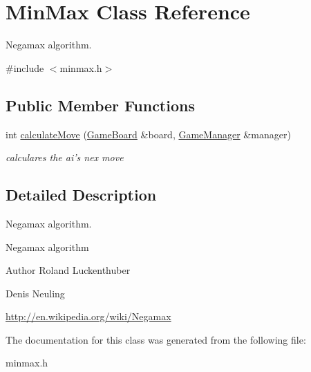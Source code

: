\hypertarget{classMinMax}{\section{\-Min\-Max \-Class \-Reference}
\label{classMinMax}
}


\-Negamax algorithm.  




{\ttfamily \#include $<$minmax.\-h$>$}

\subsection*{\-Public \-Member \-Functions}
\begin{DoxyCompactItemize}
\item 
\hypertarget{classMinMax_a0727d40296556cb72e6b147796e9cb06}{int \hyperlink{classMinMax_a0727d40296556cb72e6b147796e9cb06}{calculate\-Move} (\hyperlink{classGameBoard}{\-Game\-Board} \&board, \hyperlink{classGameManager}{\-Game\-Manager} \&manager)}\label{classMinMax_a0727d40296556cb72e6b147796e9cb06}

\begin{DoxyCompactList}\small\item\em calculares the ai's nex move \end{DoxyCompactList}\end{DoxyCompactItemize}


\subsection{\-Detailed \-Description}
\-Negamax algorithm. 

\-Negamax algorithm

\begin{DoxyAuthor}{\-Author}
\-Roland \-Luckenthuber 

\-Denis \-Neuling
\end{DoxyAuthor}
\hyperlink{}{http\-://en.\-wikipedia.\-org/wiki/\-Negamax}

\-The documentation for this class was generated from the following file\-:\begin{DoxyCompactItemize}
\item 
minmax.\-h\end{DoxyCompactItemize}
